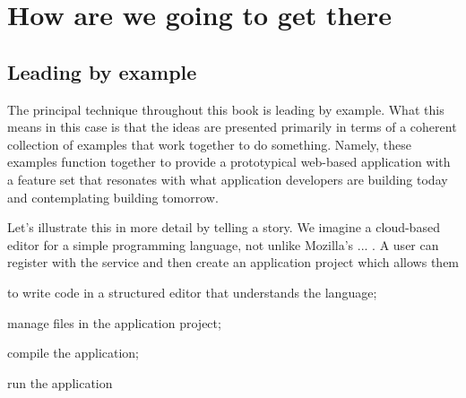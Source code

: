 \section{How are we going to get there}

\subsection{Leading by example}

The principal technique throughout this book is leading by
example. What this means in this case is that the ideas are presented
primarily in terms of a coherent collection of examples that work
together to do something. Namely, these examples function together to
provide a prototypical web-based application with a feature set that
resonates with what application developers are building today and
contemplating building tomorrow.

Let's illustrate this in more detail by telling a story. We imagine a
cloud-based editor for a simple programming language, not unlike
Mozilla's ... . A user can register with the service and then create
an application project which allows them 
\begin{list}
\item to write code in a structured editor that understands the
  language;
\item manage files in the application project;
\item compile the application;
\item run the application
\end{list}
